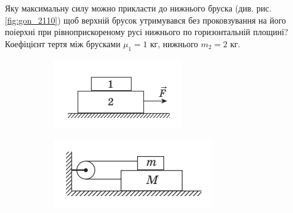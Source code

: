 \begin{problem}{6}
	
	Яку максимальну силу можно прикласти до нижнього бруска (див. рис. \ref{fig:gon_2110}) щоб верхній брусок утримувався без проковзування на його поіерхні при рівноприскореному русі нижнього по горизонтальній площині? Коефіцієнт тертя між брусками $\mu_1 = 1$ кг, нижнього $m_2 = 2$ кг.
	
	\begin{figure}[h!]
		\centering
		\begin{subfigure}{.4\textwidth}
			\centering
			\includegraphics[width=0.5\linewidth]{class5/gon_2110}
			\caption{}
			\label{fig:gon2110}
		\end{subfigure}
		\begin{subfigure}{.4\textwidth}
			\centering
			\includegraphics[width=0.5\linewidth]{class5/gon_2113}
			\caption{}
			\label{fig:gon2113}
		\end{subfigure}
		\caption{}
	\end{figure}
\end{problem}

